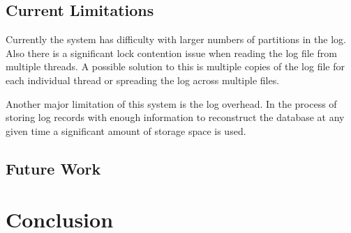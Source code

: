 \documentclass{article}
\begin{document}
\subsection{Current Limitations}
Currently the system has difficulty with larger numbers of partitions in the log. Also there is a significant lock contention issue when reading the log file from multiple threads. A possible solution to this is multiple copies of the log file for each individual thread or spreading the log across multiple files.

Another major limitation of this system is the log overhead. In the process of storing log records with enough information to reconstruct the database at any given time a significant amount of storage space is used. 
\subsection{Future Work}
\section{Conclusion}



\end{document}
